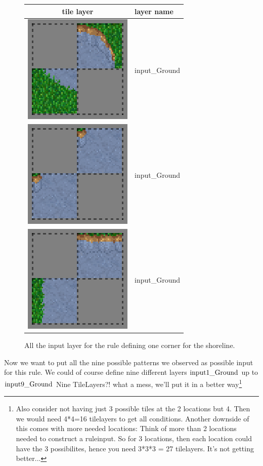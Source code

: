 \begin{figure}
		\begin{tabular}{|c|l|}
		\hline
		tile layer & layer name  \\
		\hline
		\hline
		\includegraphics[scale=1]{Example/TheManaWorld/shorelinecorners/input_Ground2.eps} & input\_Ground \\
		\hline
		\includegraphics[scale=1]{Example/TheManaWorld/shorelinecorners/input_Ground1.eps} & input\_Ground \\
		\hline
		\includegraphics[scale=1]{Example/TheManaWorld/shorelinecorners/input_Ground.eps} & input\_Ground \\
		\hline	
		\end{tabular}
		\caption{All the input layer for the rule defining one corner for the shoreline.}
		\label{shorelinecorner_inputsection}		
\end{figure}
Now we want to put all the nine possible patterns we observed as possible
input for this rule. We could of course define nine different layers
$\textup{input}1  \_\textup{Ground}$ up to
$\textup{input}9  \_\textup{Ground}$
Nine TileLayers?! what a mess, we'll put it in a better way\footnote{
Also consider not having just 3 possible tiles at the 2 locations but 4.
Then we would need 4*4=16 tilelayers to get all conditions. Another downside
of this comes with more needed locations:
Think of more than 2 locations needed to construct a ruleinput. So for 3
locations, then each location could have the 3 possibilites, hence you need
3*3*3 = 27 tilelayers. It's not getting better...}


